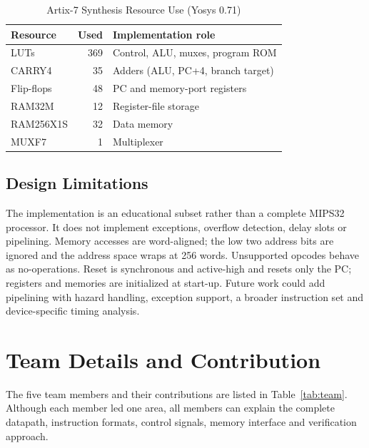 \documentclass[conference]{IEEEtran}
\begin{document}
\begin{table}[t]
\caption{Artix-7 Synthesis Resource Use (Yosys 0.71)}
\label{tab:fpga}
\centering\footnotesize
\begin{tabular}{@{}lrl@{}}
\toprule
Resource & Used & Implementation role\\
\midrule
LUTs & 369 & Control, ALU, muxes, program ROM\\
CARRY4 & 35 & Adders (ALU, PC+4, branch target)\\
Flip-flops & 48 & PC and memory-port registers\\
RAM32M & 12 & Register-file storage\\
RAM256X1S & 32 & Data memory\\
MUXF7 & 1 & Multiplexer\\
\bottomrule
\end{tabular}
\end{table}

\subsection{Design Limitations}
The implementation is an educational subset rather than a complete MIPS32 processor. It does not implement exceptions, overflow detection, delay slots or pipelining. Memory accesses are word-aligned; the low two address bits are ignored and the address space wraps at 256 words. Unsupported opcodes behave as no-operations. Reset is synchronous and active-high and resets only the PC; registers and memories are initialized at start-up. Future work could add pipelining with hazard handling, exception support, a broader instruction set and device-specific timing analysis.

\section{Team Details and Contribution}
The five team members and their contributions are listed in Table~\ref{tab:team}. Although each member led one area, all members can explain the complete datapath, instruction formats, control signals, memory interface and verification approach.
\end{document}
